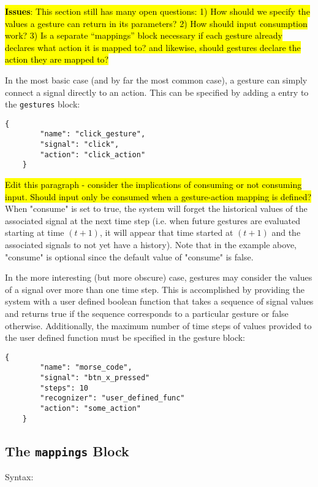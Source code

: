 \documentclass{article}
\begin{document}
\noindent
\hl{\textbf{Issues}: This section still has many open questions: 1) How should we specify the values a gesture can return in its parameters? 2) How should input consumption work? 3) Is a separate ``mappings'' block necessary if each gesture already declares what action it is mapped to? and likewise, should gestures declare the action they are mapped to?}

In the most basic case (and by far the most common case), a gesture can simply connect a signal directly to an action.
This can be specified by adding a entry to the \texttt{gestures} block:

\begin{Verbatim}[baselinestretch=1.0]
    {
        "name": "click_gesture",
        "signal": "click",
        "action": "click_action"
    }
\end{Verbatim}

\hl{Edit this paragraph - consider the implications of consuming or not consuming input.
Should input only be consumed when a gesture-action mapping is defined?} When "consume" is set to true, the system will forget the historical values of the associated signal at the next time step (i.e. when future gestures are evaluated starting at time $(t+1)$, it will appear that time started at $(t+1)$ and the associated signals to not yet have a history). Note that in the example above, "consume" is optional since the default value of "consume" is false.

In the more interesting (but more obscure) case, gestures may consider the values of a signal over more than one time step.
This is accomplished by providing the system with a user defined boolean function that takes a sequence of signal values and returns true if the sequence corresponds to a particular gesture or false otherwise. Additionally, the maximum number of time steps of values provided to the user defined function must be specified in the gesture block:

\begin{Verbatim}[baselinestretch=1.0]
    {
        "name": "morse_code",
        "signal": "btn_x_pressed"
        "steps": 10
        "recognizer": "user_defined_func"
        "action": "some_action"
    }
\end{Verbatim}

\subsection{The \texttt{mappings} Block}
Syntax:
\end{document}
